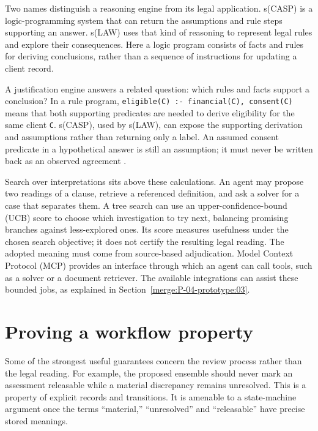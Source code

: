 \documentclass[12pt,a4paper,oneside,openany]{book}
\begin{document}
Two names distinguish a reasoning engine from its legal application. s(CASP)
is a logic-programming system that can return the assumptions and rule steps
supporting an answer. s(LAW) uses that kind of reasoning to represent legal
rules and explore their consequences. Here a logic program consists of facts
and rules for deriving conclusions, rather than a sequence of instructions
for updating a client record.

A justification engine answers a related question: which rules and facts support
a conclusion? In a rule program, \texttt{eligible(C) :- financial(C), consent(C)}
means that both supporting predicates are needed to derive eligibility for the
same client \texttt{C}. s(CASP), used by s(LAW), can expose the supporting
derivation and assumptions rather than returning only a label. An assumed
consent predicate in a hypothetical answer is still an assumption; it must never
be written back as an observed agreement \citep{slaw2024}.

Search over interpretations sits above these calculations. An agent may propose
two readings of a clause, retrieve a referenced definition, and ask a solver for
a case that separates them. A tree search can use an upper-confidence-bound
(UCB) score to choose which investigation to try next, balancing promising
branches against less-explored ones. Its score measures usefulness under the chosen search
objective; it does not certify the resulting legal reading. The adopted meaning
must come from source-based adjudication. Model Context Protocol (MCP) provides
an interface through which an agent can call tools, such as a solver or a
document retriever. The available integrations can assist these bounded jobs,
as explained in Section~\ref{merge:P-04-prototype:03}.

\section{Proving a workflow property}
\label{merge:M03:10}

\label{sec:proof-workflow}
Some of the strongest useful guarantees concern the review process rather than
the legal reading. For example, the proposed ensemble should never mark an
assessment releasable while a material discrepancy remains unresolved. This is
a property of explicit records and transitions. It is amenable to a state-machine
argument once the terms ``material,'' ``unresolved'' and ``releasable'' have
precise stored meanings.
\end{document}
